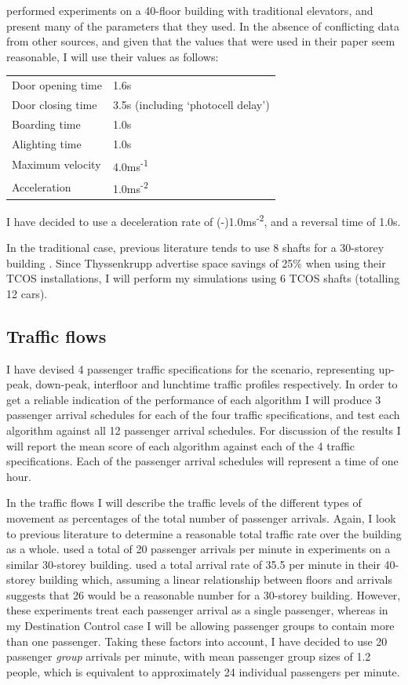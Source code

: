 \documentclass{UoYCSproject}
\begin{document}
\citet{Rong2003} performed experiments on a 40-floor building with traditional elevators, and present many of the parameters that they used.  In the absence of conflicting data from other sources, and given that the values that were used in their paper seem reasonable, I will use their values as follows:

\begin{tabular}{l l}
	Door opening time			& 1.6s \\
	Door closing time			& 3.5s (including `photocell delay') \\
	Boarding time				& 1.0s \\
	Alighting time				& 1.0s \\
	Maximum velocity			& 4.0ms\textsuperscript{-1} \\
	Acceleration				& 1.0ms\textsuperscript{-2}
\end{tabular}

I have decided to use a deceleration rate of (-)1.0ms\textsuperscript{-2}, and a reversal time of 1.0s.

In the traditional case, previous literature tends to use 8 shafts for a 30-storey building \citep{Siikonen1993, Nikovski2003, Brand2004}.  Since Thyssenkrupp advertise space savings of 25\% when using their TCOS installations, I will perform my simulations using 6 TCOS shafts (totalling 12 cars).

\subsection{Traffic flows}

I have devised 4 passenger traffic specifications for the scenario, representing up-peak, down-peak, interfloor and lunchtime traffic profiles respectively.  In order to get a reliable indication of the performance of each algorithm I will produce 3 passenger arrival schedules for each of the four traffic specifications, and test each algorithm against all 12 passenger arrival schedules.  For discussion of the results I will report the mean score of each algorithm against each of the 4 traffic specifications.  Each of the passenger arrival schedules will represent a time of one hour.

In the traffic flows I will describe the traffic levels of the different types of movement as percentages of the total number of passenger arrivals.  Again, I look to previous literature to determine a reasonable total traffic rate over the building as a whole.  \citet{Siikonen1993} used a total of 20 passenger arrivals per minute in experiments on a similar 30-storey building.  \citet{Rong2003} used a total arrival rate of 35.5 per minute in their 40-storey building which, assuming a linear relationship between floors and arrivals suggests that 26 would be a reasonable number for a 30-storey building.  However, these experiments treat each passenger arrival as a single passenger, whereas in my Destination Control case I will be allowing passenger groups to contain more than one passenger.  Taking these factors into account, I have decided to use 20 passenger \textit{group} arrivals per minute, with mean passenger group sizes of 1.2 people, which is equivalent to approximately 24 individual passengers per minute.
\end{document}
